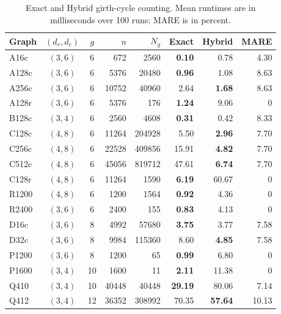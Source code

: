 \begin{table}[t]
\centering
\caption{Exact and Hybrid girth-cycle counting. Mean runtimes are in milliseconds over 100 runs; MARE is in percent.}
\label{tab:combined-exp}
\scriptsize
\setlength{\tabcolsep}{2pt}
\begin{tabular}{lccrrrrr}\hline
Graph & $(d_v,d_c)$ & $g$ & $n$ & $N_g$ &
Exact & Hybrid & MARE\\\hline
A16c & $(3,6)$ & 6 & 672 & 2560 & \textbf{0.10} & 0.78 & 4.30 \\
A128c & $(3,6)$ & 6 & 5376 & 20480 & \textbf{0.96} & 1.08 & 8.63 \\
A256c & $(3,6)$ & 6 & 10752 & 40960 & 2.64 & \textbf{1.68} & 8.63 \\
A128r & $(3,6)$ & 6 & 5376 & 176 & \textbf{1.24} & 9.06 & 0 \\
B128c & $(3,4)$ & 6 & 2560 & 4608 & \textbf{0.31} & 0.42 & 8.33 \\
C128c & $(4,8)$ & 6 & 11264 & 204928 & 5.50 & \textbf{2.96} & 7.70 \\
C256c & $(4,8)$ & 6 & 22528 & 409856 & 15.91 & \textbf{4.82} & 7.70 \\
C512c & $(4,8)$ & 6 & 45056 & 819712 & 47.61 & \textbf{6.74} & 7.70 \\
C128r & $(4,8)$ & 6 & 11264 & 1590 & \textbf{6.19} & 60.67 & 0 \\
R1200 & $(4,8)$ & 6 & 1200 & 1564 & \textbf{0.92} & 4.36 & 0 \\
R2400 & $(3,6)$ & 6 & 2400 & 155 & \textbf{0.83} & 4.13 & 0 \\
D16c & $(3,6)$ & 8 & 4992 & 57680 & \textbf{3.75} & 3.77 & 7.58 \\
D32c & $(3,6)$ & 8 & 9984 & 115360 & 8.60 & \textbf{4.85} & 7.58 \\
P1200 & $(3,6)$ & 8 & 1200 & 65 & \textbf{0.99} & 6.80 & 0 \\
P1600 & $(3,4)$ & 10 & 1600 & 11 & \textbf{2.11} & 11.38 & 0 \\
Q410 & $(3,4)$ & 10 & 40448 & 40448 & \textbf{29.19} & 80.06 & 7.14 \\
Q412 & $(3,4)$ & 12 & 36352 & 308992 & 70.35 & \textbf{57.64} & 10.13 \\
\hline
\end{tabular}
\end{table}
